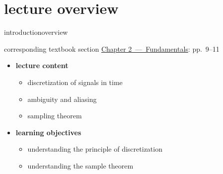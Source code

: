 




\subtitle{Module 2.1: Fundamentals~---~Sampling}


	

    \section[overview]{lecture overview}
        \begin{frame}{introduction}{overview}
            \begin{block}{corresponding textbook section}
                    \href{http://ieeexplore.ieee.org/xpl/articleDetails.jsp?tp=&arnumber=6331119&}{Chapter 2~---~Fundamentals}: pp.~9--11
            \end{block}

            \begin{itemize}
                \item   \textbf{lecture content}
                    \begin{itemize}
                        \item   discretization of signals in time
                        \item   ambiguity and aliasing
                        \item   sampling theorem
                    \end{itemize}
                \bigskip
                \item<2->   \textbf{learning objectives}
                    \begin{itemize}
                        \item   understanding the principle of discretization
                        \item   understanding the sample theorem
                    \end{itemize}
            \end{itemize}
        \end{frame}
        
